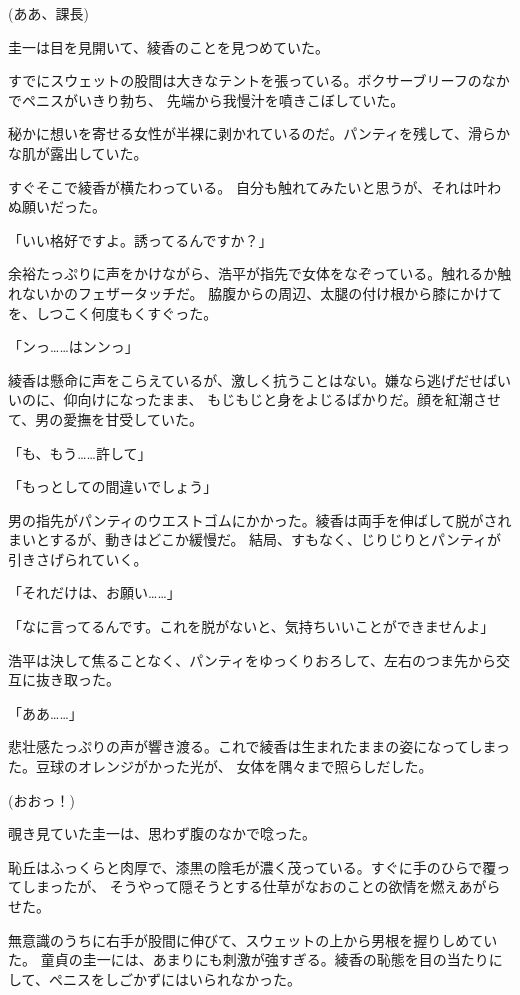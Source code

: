 ﻿\documentclass[
    book,tate,
    line_length=30zw,
    jafontsize=12pt,
    paper=b5j,
    landscape,
    ]{jlreq}
\begin{document}
(ああ、課長)

圭一は目を見開いて、綾香のことを見つめていた。

すでにスウェットの股間は大きなテントを張っている。ボクサーブリーフのなかでペニスがいきり勃ち、
先端から我慢汁を噴きこぼしていた。

秘かに想いを寄せる女性が半裸に剥かれているのだ。パンティを残して、滑らかな肌が露出していた。

すぐそこで綾香が横たわっている。 自分も触れてみたいと思うが、それは叶わぬ願いだった。

「いい格好ですよ。誘ってるんですか？」

余裕たっぷりに声をかけながら、浩平が指先で女体をなぞっている。触れるか触れないかのフェザータッチだ。
脇腹からの周辺、太腿の付け根から膝にかけてを、しつこく何度もくすぐった。

「ンっ……はンンっ」

綾香は懸命に声をこらえているが、激しく抗うことはない。嫌なら逃げだせばいいのに、仰向けになったまま、
もじもじと身をよじるばかりだ。顔を紅潮させて、男の愛撫を甘受していた。

「も、もう……許して」

「もっとしての間違いでしょう」

男の指先がパンティのウエストゴムにかかった。綾香は両手を伸ばして脱がされまいとするが、動きはどこか緩慢だ。
結局、すもなく、じりじりとパンティが引きさげられていく。

「それだけは、お願い……」

「なに言ってるんです。これを脱がないと、気持ちいいことができませんよ」

浩平は決して焦ることなく、パンティをゆっくりおろして、左右のつま先から交互に抜き取った。

「ああ……」

悲壮感たっぷりの声が響き渡る。これで綾香は生まれたままの姿になってしまった。豆球のオレンジがかった光が、
女体を隅々まで照らしだした。

(おおっ！)

覗き見ていた圭一は、思わず腹のなかで唸った。

恥丘はふっくらと肉厚で、漆黒の陰毛が濃く茂っている。すぐに手のひらで覆ってしまったが、
そうやって隠そうとする仕草がなおのことの欲情を燃えあがらせた。

無意識のうちに右手が股間に伸びて、スウェットの上から男根を握りしめていた。
童貞の圭一には、あまりにも刺激が強すぎる。綾香の恥態を目の当たりにして、ペニスをしごかずにはいられなかった。
\end{document}
